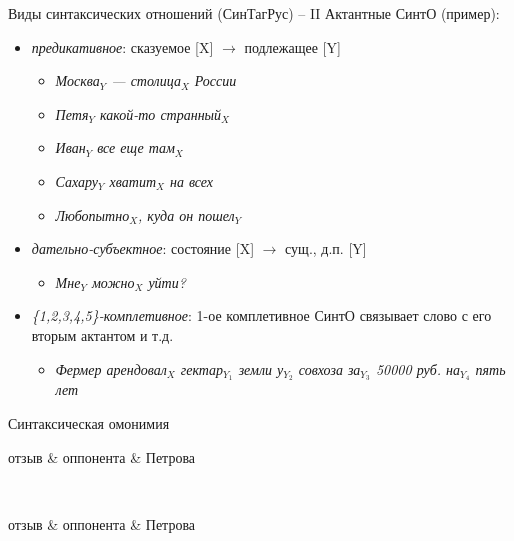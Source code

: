 \documentclass{beamer}
\begin{document}
\begin{frame}{Виды синтаксических отношений (СинТагРус) -- II}
Актантные СинтО (пример):\\
\medskip
\begin{footnotesize}
\begin{itemize}
    \item \textit{предикативное}: сказуемое [X] $\to$ подлежащее [Y]
        \begin{itemize}
            \item[] \textit{Москва$_Y$ — столица$_X$ России}
            \item[] \textit{Петя$_Y$ какой-то странный$_X$}
            \item[] \textit{Иван$_Y$ все еще там$_X$}
            \item[] \textit{Сахару$_Y$ хватит$_X$ на всех}
            \item[] \textit{Любопытно$_X$, куда он пошел$_Y$}
        \end{itemize}
    \item \textit{дательно-субъектное}: состояние [X] $\to$ сущ., д.п. [Y]
        \begin{itemize}
            \item[] \textit{Мне$_Y$ можно$_X$ уйти?}
        \end{itemize}         
    \item \textit{\{1,2,3,4,5\}-комплетивное}: 1-ое комплетивное СинтО связывает слово с его вторым актантом и т.д.
        \begin{itemize}
            \item[] \textit{Фермер арендовал$_X$ гектар$_{Y_1}$ земли у$_{Y_2}$ совхоза за$_{Y_3}$ 50000 руб. на$_{Y_4}$ пять лет}
        \end{itemize}         
\end{itemize}
\end{footnotesize}
\end{frame}

\begin{frame}{Синтаксическая омонимия}
\begin{center}
\begin{dependency}[theme = simple]
   \begin{deptext}[column sep=1em]
      отзыв \& оппонента \& Петрова \\
   \end{deptext}
\end{dependency}
\\
\begin{dependency}[theme = simple]
   \begin{deptext}[column sep=1em]
      отзыв \& оппонента \& Петрова \\
   \end{deptext}
\end{dependency}
\end{center}
\end{frame}
\end{document}
